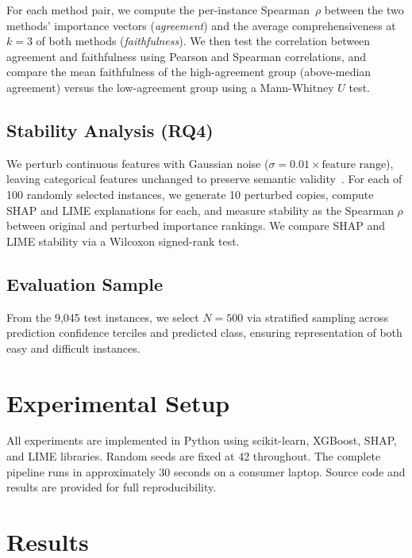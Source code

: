 \documentclass[conference, 10pt]{IEEEtran}
\begin{document}
For each method pair, we compute the per-instance Spearman~$\rho$ between the two methods' importance vectors (\emph{agreement}) and the average comprehensiveness at $k=3$ of both methods (\emph{faithfulness}). We then test the correlation between agreement and faithfulness using Pearson and Spearman correlations, and compare the mean faithfulness of the high-agreement group (above-median agreement) versus the low-agreement group using a Mann-Whitney $U$ test.

\subsection{Stability Analysis (RQ4)}

We perturb continuous features with Gaussian noise ($\sigma = 0.01 \times \text{feature range}$), leaving categorical features unchanged to preserve semantic validity~\cite{alvarez2018robustness}. For each of 100 randomly selected instances, we generate 10 perturbed copies, compute SHAP and LIME explanations for each, and measure stability as the Spearman $\rho$ between original and perturbed importance rankings. We compare SHAP and LIME stability via a Wilcoxon signed-rank test.

\subsection{Evaluation Sample}

From the 9,045 test instances, we select $N = 500$ via stratified sampling across prediction confidence terciles and predicted class, ensuring representation of both easy and difficult instances.

\section{Experimental Setup}
\label{sec:setup}

All experiments are implemented in Python using scikit-learn, XGBoost, SHAP, and LIME libraries. Random seeds are fixed at 42 throughout. The complete pipeline runs in approximately 30 seconds on a consumer laptop. Source code and results are provided for full reproducibility.

\section{Results}
\label{sec:results}
\end{document}
